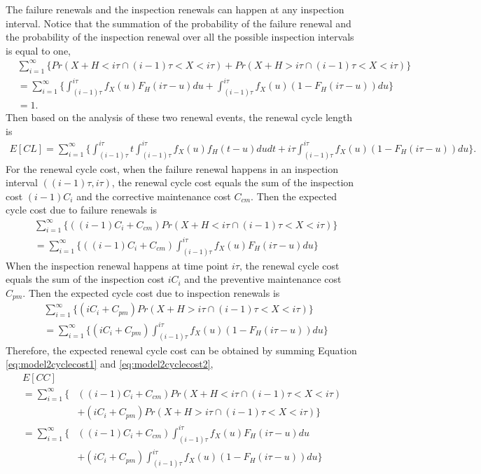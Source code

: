 \documentclass[10pt,a4paper]{article}
\theoremstyle{remark}
\begin{document}
The failure renewals and the inspection renewals can happen at any inspection interval. Notice that the summation of the probability of the failure renewal and the probability of the inspection renewal over all the possible inspection intervals is equal to one,
\begin{align*}
& \sum_{i=1}^{\infty} \Bigg\{Pr(X+H<i\tau \cap (i-1)\tau<X<i\tau )+Pr(X+H>i\tau \cap (i-1)\tau<X<i\tau ) \Bigg\} \nonumber \\
& = \sum_{i=1}^{\infty} \Bigg\{ \int_{(i-1)\tau}^{i\tau} f_{X}(u) F_{H}(i\tau-u)du+\int_{(i-1)\tau}^{i\tau} f_{X}(u) (1-F_{H}(i\tau-u))du \Bigg\} \nonumber \\
& = 1. 
\end{align*}
Then based on the analysis of these two renewal events, the renewal cycle length is
\begin{align} \label{eq:model2cyclelength}
E[CL]= \sum_{i=1}^{\infty} \Bigg\{ \int_{(i-1)\tau}^{i\tau} t \int_{(i-1)\tau}^{i\tau} f_{X}(u) f_{H}(t-u)du dt + i\tau \int_{(i-1)\tau}^{i\tau} f_{X}(u) (1-F_{H}(i\tau-u)) du \Bigg\}.  
\end{align}
For the renewal cycle cost, when the failure renewal happens in an inspection interval $((i-1)\tau,i\tau)$, the renewal cycle cost equals the sum of the inspection cost $(i-1)C_{i}$ and the corrective maintenance cost $C_{cm}$. Then the expected cycle cost due to failure renewals is
\begin{align} \label{eq:model2cyclecost1}
& \sum_{i=1}^{\infty} \Bigg\{((i-1)C_{i}+C_{cm})Pr(X+H<i\tau \cap (i-1)\tau<X<i\tau ) \Bigg\} \nonumber \\
& = \sum_{i=1}^{\infty} \Bigg\{ ((i-1)C_{i}+C_{cm})\int_{(i-1)\tau}^{i\tau} f_{X}(u) F_{H}(i\tau-u)du \Bigg\}  
\end{align} 
When the inspection renewal happens at time point $i\tau$, the renewal cycle cost equals the sum of the inspection cost $iC_{i}$ and the preventive maintenance cost $C_{pm}$. Then the expected cycle cost due to inspection renewals is
\begin{align} \label{eq:model2cyclecost2}
& \sum_{i=1}^{\infty} \Bigg\{(iC_{i}+C_{pm})Pr(X+H>i\tau \cap (i-1)\tau<X<i\tau ) \Bigg\} \nonumber \\
& = \sum_{i=1}^{\infty} \Bigg\{ (iC_{i}+C_{pm})\int_{(i-1)\tau}^{i\tau} f_{X}(u) (1-F_{H}(i\tau-u))du \Bigg\}  
\end{align}
Therefore, the expected renewal cycle cost can be obtained by summing Equation \ref{eq:model2cyclecost1} and \ref{eq:model2cyclecost2},
\begin{align} \label{eq:model2cyclecost}
 E[CC] \nonumber \\
 =\sum_{i=1}^{\infty} \Bigg\{ & ((i-1)C_{i}+C_{cm})Pr(X+H<i\tau \cap (i-1)\tau<X<i\tau) \nonumber \\
 & + (iC_{i}+C_{pm})Pr(X+H>i\tau \cap (i-1)\tau<X<i\tau ) \Bigg\} \nonumber \\
 = \sum_{i=1}^{\infty} \Bigg\{ & ((i-1)C_{i}+C_{cm})\int_{(i-1)\tau}^{i\tau} f_{X}(u) F_{H}(i\tau-u)du \nonumber \\
 & +(iC_{i}+C_{pm})\int_{(i-1)\tau}^{i\tau} f_{X}(u) (1-F_{H}(i\tau-u))du \Bigg\}  
\end{align}
\end{document}
